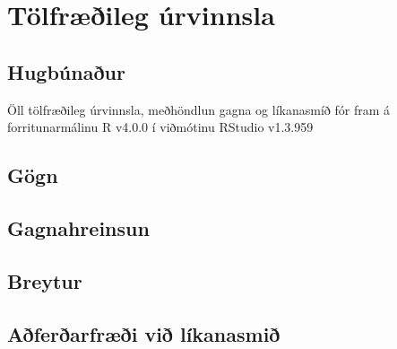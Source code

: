 \documentclass[
  12pt,
]{article}
\begin{document}
\hypertarget{tuxf6lfruxe6uxf0ileg-uxfarvinnsla}{%
\section{Tölfræðileg úrvinnsla}\label{tuxf6lfruxe6uxf0ileg-uxfarvinnsla}}

\hypertarget{hugbuxfanauxf0ur}{%
\subsection{Hugbúnaður}\label{hugbuxfanauxf0ur}}

Öll tölfræðileg úrvinnsla, meðhöndlun gagna og líkanasmíð fór fram á forritunarmálinu
R v4.0.0 í viðmótinu RStudio v1.3.959

\hypertarget{guxf6gn}{%
\subsection{Gögn}\label{guxf6gn}}

\hypertarget{gagnahreinsun}{%
\subsection{Gagnahreinsun}\label{gagnahreinsun}}

\hypertarget{breytur}{%
\subsection{Breytur}\label{breytur}}

\hypertarget{auxf0feruxf0arfruxe6uxf0i-viuxf0-luxedkanasmiuxf0}{%
\subsection{Aðferðarfræði við líkanasmið}\label{auxf0feruxf0arfruxe6uxf0i-viuxf0-luxedkanasmiuxf0}}
\end{document}

